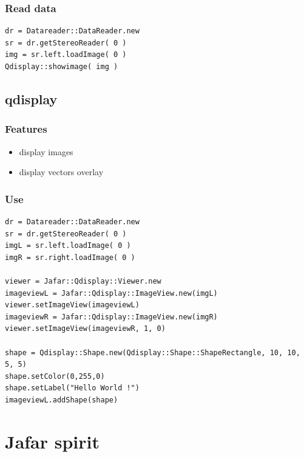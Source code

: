 \documentclass[pdf]{beamer}
\begin{document}
\begin{frame}[fragile]
  \frametitle{Read data}
  \begin{lstlisting}
dr = Datareader::DataReader.new
sr = dr.getStereoReader( 0 )
img = sr.left.loadImage( 0 )
Qdisplay::showimage( img )
  \end{lstlisting}
\end{frame}


\subsection{qdisplay}
\begin{frame}
  \frametitle{Features}
  \begin{itemize}
   \item<1-> display images
   \item<2-> display vectors overlay 
  \end{itemize}
\end{frame}

\begin{frame}[fragile]
  \frametitle{Use}
  \begin{lstlisting}
dr = Datareader::DataReader.new
sr = dr.getStereoReader( 0 )
imgL = sr.left.loadImage( 0 )
imgR = sr.right.loadImage( 0 )

viewer = Jafar::Qdisplay::Viewer.new
imageviewL = Jafar::Qdisplay::ImageView.new(imgL)
viewer.setImageView(imageviewL)
imageviewR = Jafar::Qdisplay::ImageView.new(imgR)
viewer.setImageView(imageviewR, 1, 0)

shape = Qdisplay::Shape.new(Qdisplay::Shape::ShapeRectangle, 10, 10, 5, 5)
shape.setColor(0,255,0)
shape.setLabel("Hello World !")
imageviewL.addShape(shape)
  \end{lstlisting}
\end{frame}

\section{Jafar spirit}
\end{document}
